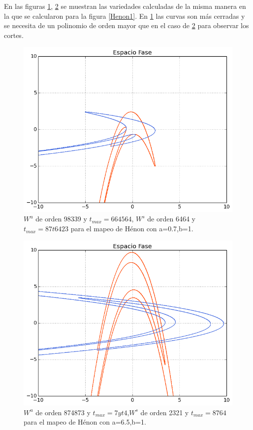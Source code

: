 En las figuras \ref{Henon2}, \ref{Henon3} se muestran las variedades calculadas de la misma manera en la que se calcularon para la figura \ref{Henon1}. En \ref{Henon2} las curvas son más cerradas y se necesita de un polinomio de orden mayor que en el caso de \ref{Henon3} para observar los cortes. 
\begin{figure}[H]
\centering
\includegraphics[scale=0.6]{henon2}
\caption{$W^{u}$ de orden 98339 y $t_{max}=664564$, $W^{s}$ de orden 6464 y $t_{max}=87t6423$ para el mapeo de Hénon con a=0.7,b=1.}
\label{Henon2}
\end{figure}


\begin{figure}[H]
\centering
\includegraphics[scale=0.6]{henon3}
\caption{$W^{u}$ de orden 874873 y $t_{max}=7yt4$,$W^{s}$ de orden 2321 y $t_{max}=8764$ para el mapeo de Hénon con a=6.5,b=1.}
\label{Henon3}
\end{figure}

